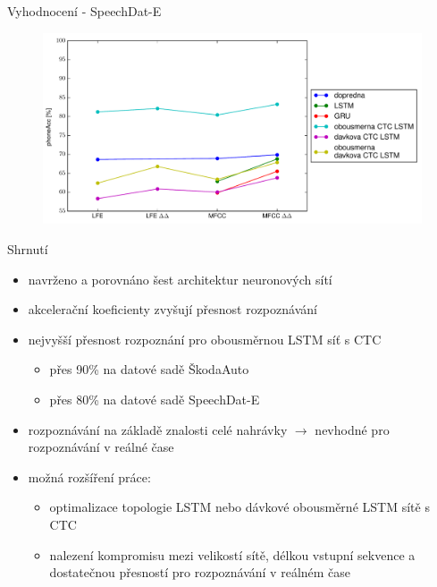 \documentclass[10pt]{beamer}
\begin{document}
\begin{frame}{Vyhodnocení - SpeechDat-E}
	\begin{figure}
		\includegraphics[width=1.0\linewidth]{speechdat_results.pdf}
	\end{figure}
\end{frame}

\begin{frame}{Shrnutí}
	\begin{itemize}
		\item navrženo a porovnáno šest architektur neuronových sítí
		\item akcelerační koeficienty zvyšují přesnost rozpoznávání
		\item nejvyšší přesnost rozpoznání pro obousměrnou LSTM síť s CTC
			\begin{itemize}
				\item přes 90\% na datové sadě ŠkodaAuto
				\item přes 80\% na datové sadě SpeechDat-E
			\end{itemize}
		\item rozpoznávání na základě znalosti celé nahrávky $ \rightarrow $ nevhodné pro rozpoznávání v reálné čase
		\item možná rozšíření práce:
			\begin{itemize}
				\item optimalizace topologie LSTM nebo dávkové obousměrné LSTM sítě s CTC
				\item nalezení kompromisu mezi velikostí sítě, délkou vstupní sekvence a dostatečnou přesností pro rozpoznávání v reálném čase
			\end{itemize}
	\end{itemize}
\end{frame}
\end{document}
